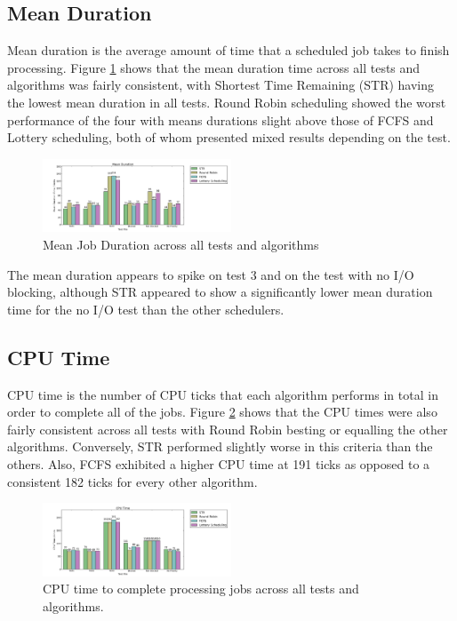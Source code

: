 \documentclass{acm_proc_article-sp}
\begin{document}
\subsection{Mean Duration}
\label{results-duration}
Mean duration is the average amount of time that a scheduled job takes to finish processing. Figure \ref{fig:duration} shows that the mean duration time across all tests and algorithms was fairly consistent, with Shortest Time Remaining (STR) having the lowest mean duration in all tests. Round Robin scheduling showed the worst performance of the four with means durations slight above those of FCFS and Lottery scheduling, both of whom presented mixed results depending on the test.

\begin{figure}[H]
\centering
\includegraphics[width=0.5\textwidth]{duration.png}
\caption{Mean Job Duration across all tests and algorithms}
\label{fig:duration}
\end{figure}

The mean duration appears to spike on test 3 and on the test with no I/O blocking, although STR appeared to show a significantly lower mean duration time for the no I/O test than the other schedulers.

\subsection{CPU Time}
CPU time is the number of CPU ticks that each algorithm performs in total in order to complete all of the jobs. Figure \ref{fig:cpu-time} shows that the CPU times were also fairly consistent across all tests with Round Robin besting or equalling the other algorithms. Conversely, STR performed slightly worse in this criteria than the others. Also, FCFS exhibited a higher CPU time at 191 ticks as opposed to a consistent 182 ticks for every other algorithm. 

\begin{figure}[H]
\centering
\includegraphics[width=0.5\textwidth]{cpu_time.png}
\caption{CPU time to complete processing jobs across all tests and algorithms.}
\label{fig:cpu-time}
\end{figure}
\end{document}
